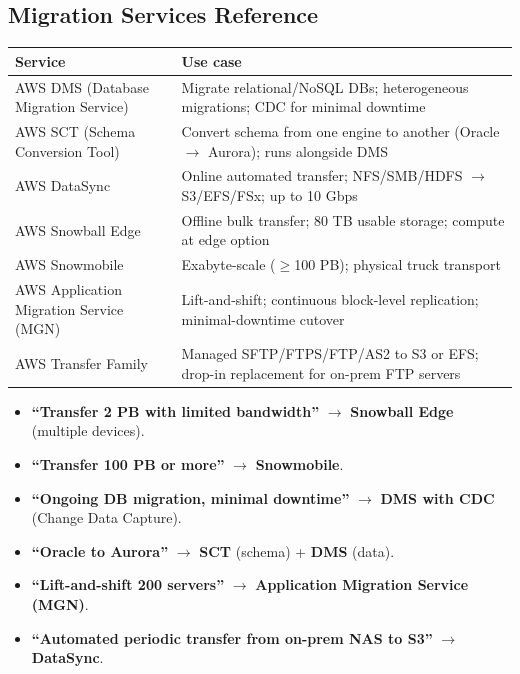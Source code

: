 \subsection{Migration Services Reference}

\begin{comparebox}[title={Migration tool selection}]
\begin{tabular}{@{}p{4cm}p{7.5cm}@{}}
\toprule
\textbf{Service} & \textbf{Use case} \\
\midrule
AWS DMS (Database Migration Service) & Migrate relational/NoSQL DBs; heterogeneous migrations; CDC for minimal downtime \\[3pt]
AWS SCT (Schema Conversion Tool)     & Convert schema from one engine to another (Oracle $\to$ Aurora); runs alongside DMS \\[3pt]
AWS DataSync                         & Online automated transfer; NFS/SMB/HDFS $\to$ S3/EFS/FSx; up to 10 Gbps \\[3pt]
AWS Snowball Edge                    & Offline bulk transfer; 80 TB usable storage; compute at edge option \\[3pt]
AWS Snowmobile                       & Exabyte-scale ($\geq$100 PB); physical truck transport \\[3pt]
AWS Application Migration Service (MGN) & Lift-and-shift; continuous block-level replication; minimal-downtime cutover \\[3pt]
AWS Transfer Family                  & Managed SFTP/FTPS/FTP/AS2 to S3 or EFS; drop-in replacement for on-prem FTP servers \\[3pt]
\bottomrule
\end{tabular}
\end{comparebox}

\begin{examtip}[title={[!] Migration exam shortcuts}]
\begin{itemize}
  \item \textbf{``Transfer 2 PB with limited bandwidth''} $\to$ \textbf{Snowball Edge} (multiple devices).
  \item \textbf{``Transfer 100 PB or more''} $\to$ \textbf{Snowmobile}.
  \item \textbf{``Ongoing DB migration, minimal downtime''} $\to$ \textbf{DMS with CDC} (Change Data Capture).
  \item \textbf{``Oracle to Aurora''} $\to$ \textbf{SCT} (schema) + \textbf{DMS} (data).
  \item \textbf{``Lift-and-shift 200 servers''} $\to$ \textbf{Application Migration Service (MGN)}.
  \item \textbf{``Automated periodic transfer from on-prem NAS to S3''} $\to$ \textbf{DataSync}.
\end{itemize}
\end{examtip}

